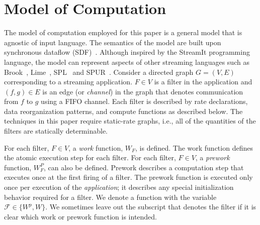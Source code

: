 \section{Model of Computation}
\label{model}

The model of computation employed for this paper is a general model
that is agnostic of input language.  The semantics of the model are
built upon synchronous dataflow (SDF)~\cite{leeSDF}.  Although
inspired by the StreamIt programming language, the model can represent
aspects of other streaming languages such as Brook~\cite{brook04},
Lime~\cite{lime10}, SPL~\cite{spl09} and SPUR~\cite{spur05samos}.
Consider a directed graph $G = (V, E)$ corresponding to a streaming
application. $F \in V$ is a filter in the application and $(f, g) \in
E$ is an edge (or {\it channel}) in the graph that denotes
communication from $f$ to $g$ using a FIFO channel.  Each filter is
described by rate declarations, data reorganization patterns,
and compute functions as described below. The techniques in this paper
require static-rate graphs, i.e., all of the quantities of the filters
are statically determinable.



For each filter, $F \in V$, a {\it work} function, $W_F$, is defined.
The work function defines the atomic execution step for each filter.
For each filter, $F \in V$, a {\it prework} function, $W_F^P$, can
also be defined.  Prework describes a computation step that executes
once at the first firing of a filter.  The prework function is
executed only once per execution of the {\it application}; it
describes any special initialization behavior required for a
filter. We denote a function with the variable $\mathcal{F} \in \{W^p,
W\}$.  We sometimes leave out the subscript that denotes the filter if
it is clear which work or prework function is intended.

